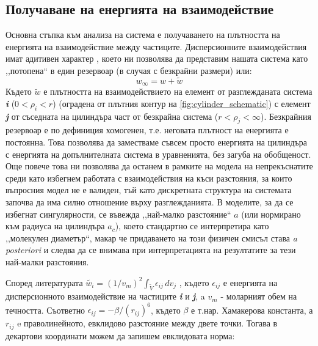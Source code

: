 \subsection{Получаване на енергията на взаимодействие}
Основна стъпка към анализа на система е получаването на плътността на енергията на взаимодействие между частиците. 
Дисперсионните взаимодействия имат адитивен характер \cite{israelachvili}, което ни позволява да представим нашата система като
,,потопена`` в един резервоар (в случая с безкрайни размери) или:
\begin{equation}
	w_{\infty}  = w + \tilde{w}
\end{equation}
Където $\tilde{w}$ е плътността на взаимодействието на елемент от разглежданата система \textbf{\textit{i}} ($0 < \rho_{i} < r$) (оградена от плътния контур на \autoref{fig:cylinder_schematic}) с елемент \textbf{\textit{j}} от съседната на цилиндъра част от безкрайна система ($r < \rho_{j} <  \infty$).
Безкрайния резервоар е по дефиниция хомогенен, т.е. неговата плътност на енергията е постоянна. Това позволява да заместваме съвсем просто енергията на цилиндъра с енергията на допълнителната система в уравненията, без загуба на обобщеност.
Още повече това ни позволява да останем в рамките на модела на непрекъснатите среди като избегнем работата с взаимодействия на къси разстояния, за които въпросния модел не е валиден, тъй като дискретната структура на системата започва да има силно отношение върху разглежданията.
В моделите, за да се избегнат сингулярности, се въвежда ,,най-малко разстояние`` $a$ (или нормирано към радиуса на цилиндъра $a_{c}$),
което стандартно се интерпретира като ,,молекулен диаметър``, макар че придаването на този физичен смисъл става \textit{a posteriori} \cite{israelachvili} и следва да се внимава 
при интерпретацията на резултатите за тези най-малки разстояния.


Според литературата  $\tilde{w_{i}} = (1/v_{m})^2 \int_{\tilde{V}}\epsilon_{ij}\,dv_{j}$ \cite{israelachvili}, където $\epsilon_{ij}$ е енергията на дисперсионното взаимодействие на частиците \textbf{\textit{i}} и \textbf{\textit{j}}, a $v_{m}$ - моларният обем на течността.
Съответно $\epsilon_{ij} = -\beta/(r_{ij})^6$, където $\beta$ е т.нар. Хамакерова константа, а $r_{ij}$ e праволинейното, евклидово разстояние между двете точки.
Тогава в декартови координати можем да запишем евклидовата норма:

